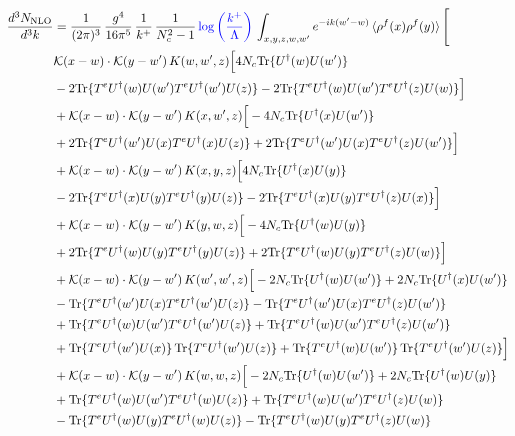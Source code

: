 \documentclass[9pt]{article}
\numberwithin{equation}{section}
\begin{document}
\begin{align}
    \frac{d^{3}N_{\mathrm{NLO}}}{d^{3}k} & = \frac{1}{(2\pi)^{3}}\,\frac{g^{4}}{16\pi^{5}}\,\frac{1}{k^{+}}\,\frac{1}{N^{2}_{c}-1}\,{\color{blue}\log{\left(\frac{k^{+}}{\Lambda}\right)}}\,\int_{x,y,z,w,w'}e^{-ik(w'-w)}\,\langle\rho^{f}(x)\rho^{f}(y) \rangle\,\Bigg[\notag \\ & \mathcal K(x-w)\cdot\mathcal K(y-w')\,K(w,w',z)\Big[4 N_{c}{\rm Tr}\{U^\dagger(w)U(w')\}\notag\\
&-2{\rm Tr}\{T^eU^\dagger(w)U(w')T^eU^\dagger(w')U(z)\}-2{\rm Tr}\{T^eU^\dagger(w)U(w')T^eU^\dagger(z)U(w)\}\Big]\notag\\
&+\mathcal K(x-w)\cdot\mathcal K(y-w')\,K(x,w',z)\Big[-4 N_{c}{\rm Tr}\{U^\dagger(x)U(w')\}\notag\\
&+2{\rm Tr}\{T^eU^\dagger(w')U(x)T^eU^\dagger(x)U(z)\}+2{\rm Tr}\{T^eU^\dagger(w')U(x)T^eU^\dagger(z)U(w')\}\Big]\notag\\
&+\mathcal K(x-w)\cdot\mathcal K(y-w')\,K(x,y,z)\Big[4 N_{c}{\rm Tr}\{U^\dagger(x)U(y)\}\notag\\
&-2{\rm Tr}\{T^eU^\dagger(x)U(y)T^eU^\dagger(y)U(z)\}-2{\rm Tr}\{T^eU^\dagger(x)U(y)T^eU^\dagger(z)U(x)\}\Big]\notag\\
&+\mathcal K(x-w)\cdot\mathcal K(y-w')\,K(y,w,z)\Big[-4 N_{c}{\rm Tr}\{U^\dagger(w)U(y)\}\notag\\
&+2{\rm Tr}\{T^eU^\dagger(w)U(y)T^eU^\dagger(y)U(z)\}+2{\rm Tr}\{T^eU^\dagger(w)U(y)T^eU^\dagger(z)U(w)\}\Big]\notag\\
&+\mathcal K(x-w)\cdot\mathcal K(y-w')\,K(w',w',z)\Big[-2 N_{c}{\rm Tr}\{U^\dagger(w)U(w')\}+2 N_{c}{\rm Tr}\{U^\dagger(x)U(w')\}\notag\\
&-{\rm Tr}\{T^eU^\dagger(w')U(x)T^eU^\dagger(w')U(z)\}-{\rm Tr}\{T^eU^\dagger(w')U(x)T^eU^\dagger(z)U(w')\}\notag\\
&+{\rm Tr}\{T^eU^\dagger(w)U(w')T^eU^\dagger(w')U(z)\}+{\rm Tr}\{T^eU^\dagger(w)U(w')T^eU^\dagger(z)U(w')\}\notag\\
&+{\rm Tr}\{T^eU^\dagger(w')U(x)\}\,{\rm Tr}\{T^eU^\dagger(w')U(z)\}+{\rm Tr}\{T^eU^\dagger(w)U(w')\}\,{\rm Tr}\{T^eU^\dagger(w')U(z)\}\Big]\notag\\
&+\mathcal K(x-w)\cdot\mathcal K(y-w')\,K(w,w,z)\Big[-2 N_{c}{\rm Tr}\{U^\dagger(w)U(w')\}+2 N_{c}{\rm Tr}\{U^\dagger(w)U(y)\}\notag\\
&+{\rm Tr}\{T^eU^\dagger(w)U(w')T^eU^\dagger(w)U(z)\}+{\rm Tr}\{T^eU^\dagger(w)U(w')T^eU^\dagger(z)U(w)\}\notag\\
&-{\rm Tr}\{T^eU^\dagger(w)U(y)T^eU^\dagger(w)U(z)\}-{\rm Tr}\{T^eU^\dagger(w)U(y)T^eU^\dagger(z)U(w)\}\notag\\

\end{align}
\end{document}
